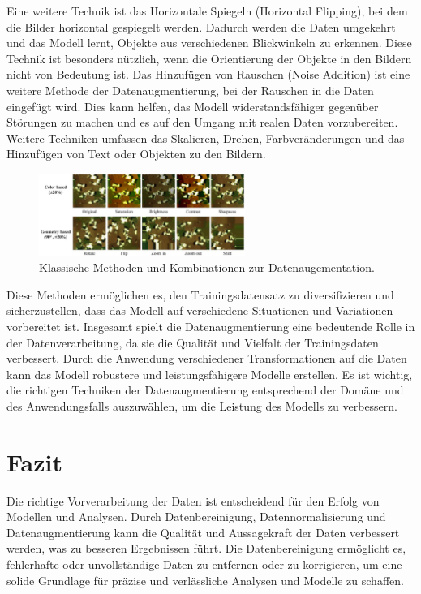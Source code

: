     Eine weitere Technik ist das Horizontale Spiegeln (Horizontal Flipping), bei dem die Bilder horizontal gespiegelt werden. Dadurch werden die Daten umgekehrt und das Modell lernt, Objekte aus verschiedenen Blickwinkeln zu erkennen. 
    Diese Technik ist besonders nützlich, wenn die Orientierung der Objekte in den Bildern nicht von Bedeutung ist.    
    Das Hinzufügen von Rauschen (Noise Addition) ist eine weitere Methode der Datenaugmentierung, bei der Rauschen in die Daten eingefügt wird.
    Dies kann helfen, das Modell widerstandsfähiger gegenüber Störungen zu machen und es auf den Umgang mit realen Daten vorzubereiten.    
    Weitere Techniken umfassen das Skalieren, Drehen, Farbveränderungen und das Hinzufügen von Text oder Objekten zu den Bildern. 

    \begin{figure}[!h]
        \centering
        \includegraphics[width=0.6\textwidth]{img/data_augmentation_classics.png}
        \caption{Klassische Methoden und Kombinationen zur Datenaugementation.}
        \label{fig:data_augmentation_classics}
    \end{figure}
    
    Diese Methoden ermöglichen es, den Trainingsdatensatz zu diversifizieren und sicherzustellen, dass das Modell auf verschiedene Situationen und Variationen vorbereitet ist.    
    Insgesamt spielt die Datenaugmentierung eine bedeutende Rolle in der Datenverarbeitung, da sie die Qualität und Vielfalt der Trainingsdaten verbessert. 
    Durch die Anwendung verschiedener Transformationen auf die Daten kann das Modell robustere und leistungsfähigere Modelle erstellen. 
    Es ist wichtig, die richtigen Techniken der Datenaugmentierung entsprechend der Domäne und des Anwendungsfalls auszuwählen, um die Leistung des Modells zu verbessern.

\section{Fazit}

Die richtige Vorverarbeitung der Daten ist entscheidend für den Erfolg von Modellen und Analysen. 
Durch Datenbereinigung, Datennormalisierung und Datenaugmentierung kann die Qualität und Aussagekraft der Daten verbessert werden, was zu besseren Ergebnissen führt. 
Die Datenbereinigung ermöglicht es, fehlerhafte oder unvollständige Daten zu entfernen oder zu korrigieren, um eine solide Grundlage für präzise und verlässliche Analysen und Modelle zu schaffen.

